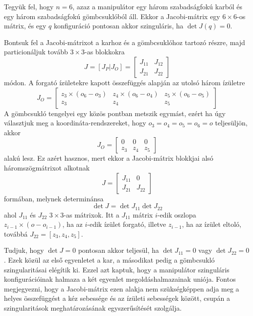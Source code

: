\documentclass[12pt,a4paper]{report}
\theoremstyle{remark}
\theoremstyle{definition}
\begin{document}
Tegyük fel, hogy $n = 6$, azaz a manipulátor egy három szabadságfokú karból és egy három szabadságfokú gömbcsuklóból 
áll. Ekkor a Jacobi-mátrix egy $6 \times 6$-os mátrix, és egy $q$ konfiguráció pontosan akkor szinguláris, ha 
$\det J(q) = 0$.

Bontsuk fel a Jacobi-mátrixot a karhoz és a gömbcsuklóhoz tartozó részre, majd particionáljuk tovább $3 \times 3$-as 
blokkokra
\begin{equation}
J = [J_P | J_O] = \left[ \begin{array}{c|c}
    J_{11} & J_{12} \\ 
    \hline
    J_{21} & J_{22}
    \end{array} \right]
\end{equation}
módon. A forgató ízületekre kapott összefüggés alapján az utolsó három ízületre
\begin{equation}
J_O = \begin{bmatrix}
    z_3 \times (o_6 - o_3) & z_4 \times (o_6 - o_4) & z_5 \times (o_6 - o_5) \\ 
    z_3 & z_4 & z_5
    \end{bmatrix} 
\end{equation}
A gömbcsukló tengelyei egy közös pontban metszik egymást, ezért ha úgy választjuk meg a koordináta-rendszereket, 
hogy $o_3 = o_4 = o_5 = o_6 = o$ teljesüljön, akkor
\begin{equation}
J_O = \begin{bmatrix}
    0 & 0 & 0 \\ 
    z_3 & z_4 & z_5
    \end{bmatrix} 
\end{equation}
alakú lesz. Ez azért hasznos, mert ekkor a Jacobi-mátrix blokkjai alsó háromszögmátrixot alkotnak
\begin{equation}
J =\begin{bmatrix}
    J_{11} & 0 \\ 
    J_{21} & J_{22}
    \end{bmatrix} 
\end{equation}
formában, melynek determinánsa
\begin{equation}
\det J = \det J_{11} \det J_{22}
\end{equation}
ahol $J_{11}$ és $J_{22}$ $3 \times 3$-as mátrixok. Itt a $J_{11}$ mátrix $i$-edik oszlopa 
$z_{i-1} \times (o - o_{i-1})$, ha az $i$-edik ízület forgató, illetve $z_{i-1}$, ha az ízület eltoló, továbbá 
$J_{22} = [z_3, z_4, z_5]$.

Tudjuk, hogy $\det J = 0$ pontosan akkor teljesül, ha $\det J_{11} = 0$ vagy $\det J_{22} = 0$. Ezek közül az első 
egyenletet a kar, a másodikat pedig a gömbcsukló szingularitásai elégítik ki. Ezzel azt kaptuk, hogy a manipulátor 
szinguláris konfigurációinak halmaza a két egyenlet megoldáshalmazainak uniója. Fontos megjegyezni, hogy a 
Jacobi-mátrix ezen alakja nem szükségképpen adja meg a helyes összefüggést a kéz sebessége és az ízületi sebességek 
között, csupán a szingularitások meghatározásának egyszerűsítését szolgálja.
\end{document}

